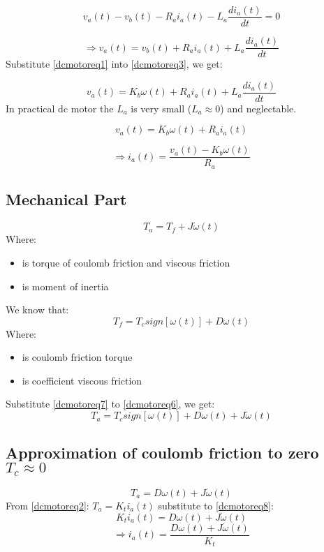 \[v_a(t) - v_b(t) - R_a i_a(t) - L_a \frac{di_a(t)}{dt} = 0\]

\begin{equation}
	\Rightarrow v_a(t) = v_b(t) + R_a i_a(t) + L_a \frac{di_a(t)}{dt}
	\label{dcmotoreq3}
\end{equation}
Substitute \autoref{dcmotoreq1} into \autoref{dcmotoreq3}, we get:

\begin{equation}
	v_a(t) = K_b \omega(t) + R_a i_a(t) + L_a \frac{di_a(t)}{dt}
	\label{dcmotoreq4}
\end{equation}
In practical dc motor the \(L_a\) is very small (\(L_a \approx 0\)) and neglectable.

\[v_a(t) = K_b \omega(t) + R_a i_a(t)\]

\begin{equation}
	\Rightarrow \boxed{i_a(t) = \frac{v_a(t) - K_b \omega(t)}{R_a}}
	\label{dcmotoreq5}
\end{equation}

\subsection{Mechanical Part}

\begin{equation}
	T_a = T_f + J \dot{\omega}(t)
	\label{dcmotoreq6}
\end{equation}
Where:
\begin{itemize}
	\item { is torque of coulomb friction and viscous friction }
	\item { is moment of inertia}
\end{itemize}
We know that:
\begin{equation}
	T_f = T_c sign[\omega(t)]+D\omega(t)
	\label{dcmotoreq7}
\end{equation}
Where:
\begin{itemize}
	\item { is coulomb friction torque}
	\item { is coefficient viscous friction}
\end{itemize}
Substitute \autoref{dcmotoreq7} to \autoref{dcmotoreq6}, we get:
\[T_a = T_c sign[\omega(t)]+D\omega(t) + J \dot{\omega}(t)\]

\subsection{Approximation of coulomb friction to zero \(T_c \approx 0\)}
\begin{equation}
	T_a = D\omega(t) + J \dot{\omega}(t)
	\label{dcmotoreq8}
\end{equation}
From \autoref{dcmotoreq2}: \(T_a = K_t i_a(t)\) substitute to \autoref{dcmotoreq8}:
\[K_t i_a(t) = D\omega(t) + J \dot{\omega}(t)\]
\begin{equation}
	\Rightarrow \boxed{i_a(t) = \frac{D\omega(t) + J \dot{\omega}(t)}{K_t}}
	\label{dcmotoreq9}
\end{equation}

